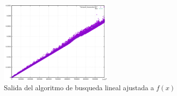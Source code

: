 \begin{figure}[h]
  \centering
  \includegraphics[width=0.5\textwidth]{./Imagenes/busqueda_lineal_ajustada.png}
  \caption{Salida del algoritmo de busqueda lineal ajustada a $f(x)$}
\end{figure}
